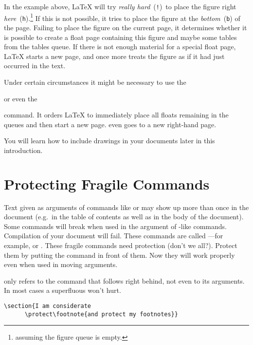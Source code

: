 \noindent In the example above, 
\LaTeX{} will try \emph{really hard}~(\texttt{!})\ to place the figure
right \emph{here}~(\texttt{h}).\footnote{assuming the figure queue is
  empty.} If this is not possible, it tries to place the figure at the
\emph{bottom}~(\texttt{b}) of the page.  Failing to place the figure
on the current page, it determines whether it is possible to create a float
page containing this figure and maybe some tables from the tables
queue. If there is not enough material for a special float page,
\LaTeX{} starts a new page, and once more treats the figure as if it
had just occurred in the text.

Under certain circumstances it might be necessary to use the 

\begin{lscommand}
 or even the  
\end{lscommand}

\noindent command. It orders \LaTeX{} to immediately place all 
floats remaining in the queues and then start a new
page.  even goes to a new right-hand page.

You will learn how to include \PSi{}
drawings in your \LaTeXe{} documents later in this introduction.

\section{Protecting Fragile Commands}

Text given as arguments of commands like  or  may
show up more than once in the document (e.g.\ in the table of contents as
well as in the body of the document). Some commands will break when used in
the argument of -like commands. Compilation of your document
will fail. These commands are called ---for example,
 or . These fragile commands need protection (don't
we all?). Protect them by putting the  command in front
of them. Now they will work properly even when used in moving arguments.

 only refers to the command that follows right behind, not even
to its arguments. In most cases a superfluous  won't hurt.

\begin{code}
\verb|\section{I am considerate|\\
\verb|      \protect\footnote{and protect my footnotes}}|
\end{code}


